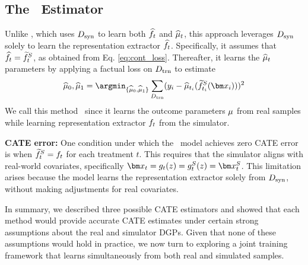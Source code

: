 \subsection{The \muonly\ Estimator}
\vspace{-0.2cm}
Unlike \simonly, which uses $D_{\text{syn}}$ to learn both $\widehat{f}_t$ and $\widehat{\mu}_t$, this approach leverages $D_{\text{syn}}$ solely to learn the representation extractor $\widehat{f}_t$. Specifically, it assumes that $\widehat{f}_t = \widetilde{f}^S_t$, as obtained from Eq. \ref{eq:cont_loss}.
Thereafter, it learns the $\widehat{\mu}_t$ parameters by applying a factual loss on $D_{\text{trn}}$ to estimate 
$$
\realmuhat_0, \realmuhat_1 = \argmin_{\{\realmuhat_0, \realmuhat_1\}} \sum_{\trnD}(y_i - \realmuhat_{t_i}(\SInvCont_{t_i}(\xb_i)))^2
$$
We call this method \muonly\ since it learns the outcome parameters $\mu$ from real samples while learning representation extractor $f_t$ from the simulator.

\textbf{CATE error:} One condition under which the  \muonly\ model achieves zero CATE error is when $\widetilde{f}^S_t = f_t$ for each treatment $t$. This requires that the simulator aligns with real-world covariates, specifically $\xb_t = g_t(z) = g_t^S(z) = \xb_t^S$. This limitation arises because the model learns the representation extractor solely from $D_{\text{syn}}$, without making adjustments for real covariates. 


In summary, we described three possible CATE estimators and showed that each method would provide accurate CATE estimates under certain strong assumptions about the real and simulator DGPs. Given that none of these assumptions would hold in practice, we now turn to exploring a joint training framework that learns simultaneously from both real and simulated samples. 



